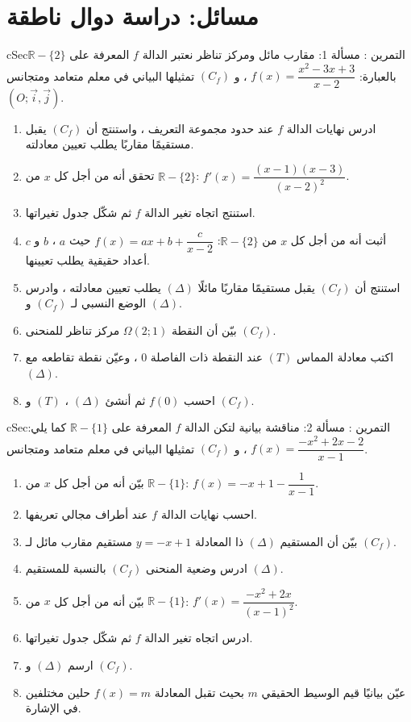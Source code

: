 \documentclass[12pt,a4paper]{article}
\newenvironment{BOX}[2]{\begin{otherlanguage}{english}\begin{arbox}{#1}{#2}}{\end{arbox}\end{otherlanguage}}
\newcounter{exo}
\newenvironment{tamrin}[1]{\stepcounter{exo}\begin{BOX}{cSec}{التمرين \theexo: #1}}{\end{BOX}}
\newcommand{\R}{\mathbb{R}}
\begin{document}
\section{مسائل: دراسة دوال ناطقة}
\begin{tamrin}{مسألة 1: مقارب مائل ومركز تناظر}
نعتبر الدالة $f$ المعرفة على $\R-\{2\}$ بالعبارة: $f(x)=\dfrac{x^2-3x+3}{x-2}$ ، و $(C_f)$ تمثيلها البياني في معلم متعامد ومتجانس $(O;\vec i,\vec j)$.
\begin{enumerate}
\item ادرس نهايات الدالة $f$ عند حدود مجموعة التعريف ، واستنتج أن $(C_f)$ يقبل مستقيمًا مقاربًا يطلب تعيين معادلته.
\item تحقق أنه من أجل كل $x$ من $\R-\{2\}$: $f'(x)=\dfrac{(x-1)(x-3)}{(x-2)^2}$.
\item استنتج اتجاه تغير الدالة $f$ ثم شكّل جدول تغيراتها.
\item أثبت أنه من أجل كل $x$ من $\R-\{2\}$: $f(x)=ax+b+\dfrac{c}{x-2}$ حيث $a$ ، $b$ و $c$ أعداد حقيقية يطلب تعيينها.
\item استنتج أن $(C_f)$ يقبل مستقيمًا مقاربًا مائلًا $(\Delta)$ يطلب تعيين معادلته ، وادرس الوضع النسبي لـ $(C_f)$ و $(\Delta)$.
\item بيّن أن النقطة $\Omega(2;1)$ مركز تناظر للمنحنى $(C_f)$.
\item اكتب معادلة المماس $(T)$ عند النقطة ذات الفاصلة $0$ ، وعيّن نقطة تقاطعه مع $(\Delta)$.
\item احسب $f(0)$ ثم أنشئ $(\Delta)$ ، $(T)$ و $(C_f)$.
\end{enumerate}
\end{tamrin}

\begin{tamrin}{مسألة 2: مناقشة بيانية}
لتكن الدالة $f$ المعرفة على $\R-\{1\}$ كما يلي: $f(x)=\dfrac{-x^2+2x-2}{x-1}$ ، و $(C_f)$ تمثيلها البياني في معلم متعامد ومتجانس.
\begin{enumerate}
\item بيّن أنه من أجل كل $x$ من $\R-\{1\}$: $f(x)=-x+1-\dfrac1{x-1}$.
\item احسب نهايات الدالة $f$ عند أطراف مجالي تعريفها.
\item بيّن أن المستقيم $(\Delta)$ ذا المعادلة $y=-x+1$ مستقيم مقارب مائل لـ $(C_f)$.
\item ادرس وضعية المنحنى $(C_f)$ بالنسبة للمستقيم $(\Delta)$.
\item بيّن أنه من أجل كل $x$ من $\R-\{1\}$: $f'(x)=\dfrac{-x^2+2x}{(x-1)^2}$.
\item ادرس اتجاه تغير الدالة $f$ ثم شكّل جدول تغيراتها.
\item ارسم $(\Delta)$ و $(C_f)$.
\item عيّن بيانيًا قيم الوسيط الحقيقي $m$ بحيث تقبل المعادلة $f(x)=m$ حلين مختلفين في الإشارة.
\end{enumerate}
\end{tamrin}
\end{document}

